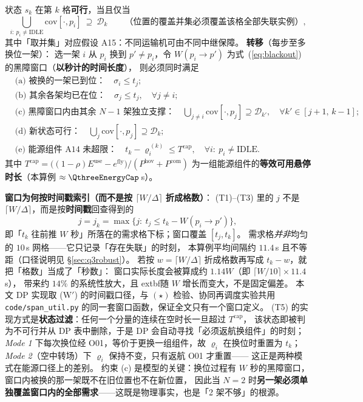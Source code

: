 \documentclass[12pt,a4paper,fontset=windows]{ctexart}
\begin{document}
状态 $s_k$ 在第 $k$ 格\textbf{可行}，当且仅当
\begin{equation}\label{eq:dpvalid}\tag{V}
\bigcup_{i:\ p_i\ne\mathrm{IDLE}} \mathrm{cov}[\cdot,p_i]\ \supseteq\ \mathcal{D}_k
\qquad\text{（位置的覆盖并集必须覆盖该格全部失联实例）},
\end{equation}
其中「取并集」对应假设 A15：不同运输机可由不同中继保障。
\textbf{转移}（每步至多换位一架）：
选一架 $i$ 从 $p_i$ 换到 $p'\ne p_i$，令 $W(p_i\!\to\!p')$ 为式~(\ref{eq:blackout}) 的黑障窗口（\textbf{以秒计的时间长度}），
则必须同时满足
\begin{align}\label{eq:dpmove}
&\text{(a) 被换的一架已到位：}\quad \sigma_i\le t_j;\tag{T1}\\
&\text{(b) 其余各架均已在位：}\quad \sigma_j\le t_j,\quad \forall j\ne i;\tag{T2}\\
&\text{(c) 黑障窗口内由其余 $N-1$ 架独立支撑：}\quad
   \bigcup_{j\ne i}\mathrm{cov}[\cdot,p_j]\supseteq \mathcal{D}_{k'},\quad \forall k'\in[j+1,\,k-1];\tag{T3}\\
&\text{(d) 新状态可行：}\quad \bigcup_{j}\mathrm{cov}[\cdot,p_j]\supseteq \mathcal{D}_k ;\tag{T4}\\
&\text{(e) 能源组件 A14 未超限：}\quad
   t_k-\varrho_i^{\,(k)}\le T^{\mathrm{cap}},\quad \forall i:\ p_i\ne\mathrm{IDLE}.\tag{T5}
\end{align}
其中 $T^{\mathrm{cap}}=\big((1-\rho)E^{\mathrm{use}}-e^{\mathrm{fly}}\big)/(P^{\mathrm{hov}}+P^{\mathrm{com}})$
为一组能源组件的\textbf{等效可用悬停时长}（本算例 $\approx\QthreeEnergyCap$\,s）。

\noindent\textbf{窗口为何按时间戳索引（而不是按 $\lceil W/\Delta\rceil$ 折成格数）}：
(T1)--(T3) 里的 $j$ 不是 $\lceil W/\Delta\rceil$，而是按\textbf{时间戳}回查得到的
\begin{equation}\label{eq:jwin}\tag{W$'$}
j=j_k=\max\bigl\{j:\ t_j\le t_k-W(p_i\!\to\!p')\bigr\},
\end{equation}
即「$t_k$ 往前推 $W$ 秒」所落在的需求格下标；窗口覆盖 $[t_j,t_k]$。
需求格\emph{并非}均匀的 $10$\,s 网格——它只记录「存在失联」的时刻，
本算例平均间隔约 $11.4$\,s 且不等距（口径说明见 \S\ref{sec:q3robust}）。
若按 $w=\lceil W/\Delta\rceil$ 折成格数再写成 $t_k-w$，就把「格数」当成了「秒数」：
窗口实际长度会被算成约 $1.14W$（即 $\lceil W/10\rceil\times 11.4$\,s），
带来约 $14\%$ 的系统性放大，且	extbf{随 $W$ 增长而变大}，不是固定偏差。
本文 DP 实现取 (W$'$) 的时间戳口径，与 $(\star)$ 检验、协同再调度实验共用
\texttt{code/span\_util.py} 的同一套窗口函数，保证全文只有一个窗口定义。
(T5) 的实现方式是\textbf{状态过滤}：任何一个分量的连续在空时长一旦超过 $T^{\mathrm{cap}}$，
该状态即被判为不可行并从 DP 表中删除，于是 DP 会自动寻找「必须返航换组件」的时刻；
\emph{Mode 1} 下每次换位经 O01，等价于更换一组组件，故 $\varrho_i$ 在换位时重置为 $t_k$；
\emph{Mode 2}（空中转场）下 $\varrho_i$ 保持不变，只有返航 O01 才重置——
这正是两种模式在能源口径上的差别。
约束 (c) 是模型的关键：换位过程有 $W$ 秒的黑障窗口，窗口内被换的那一架既不在旧位置也不在新位置，
因此当 $N=2$ 时\textbf{另一架必须单独覆盖窗口内的全部需求}——这既是物理事实，也是「2 架不够」的根源。
\end{document}
